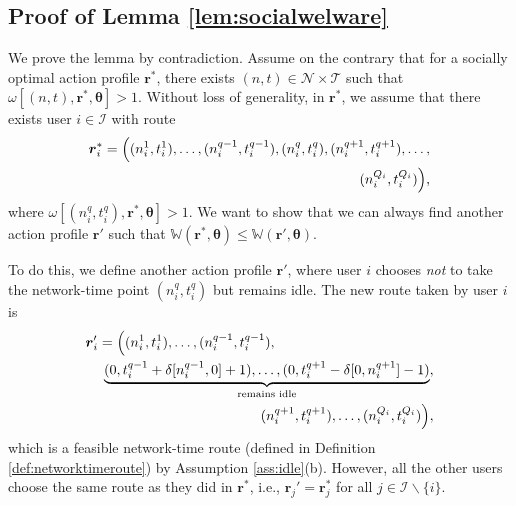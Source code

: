 \documentclass[journal]{IEEEtran}
\newcommand{\mc}[1]{\mathcal{#1}}
\newcommand{\bs}[1]{\boldsymbol{#1}}
\begin{document}
\appendix



\subsection{Proof of Lemma \ref{lem:socialwelware}} \label{app:socialwelware}

  We prove the lemma by contradiction. 
	Assume on the contrary that for a socially optimal action profile $\bs{r}^*$, there exists $(n,t) \in \mc{N} \times \mc{T}$ such that $\omega[(n, t), \boldsymbol{r}^*, \boldsymbol{\theta}] > 1$.
	Without loss of generality, in $\bs{r}^*$, we assume that there exists user $i \in \mc{I}$ with route	
%
\begin{equation}
\begin{split}
	\boldsymbol{r}_i^* = \Bigl((n_i^{1},t_i^{1}),\ldots,(n_i^{q-1},t_i^{q-1}),(n_i^{q},t_i^{q}),(n_i^{q+1},t_i^{q+1}),\ldots,\\(n_i^{Q_i},t_i^{Q_i})\Bigr),
\end{split}
\end{equation}
% 	
where $\omega[(n_i^q, t_i^q), \boldsymbol{r}^*, \boldsymbol{\theta}] > 1$.
  We want to show that we can always find another action profile $\bs{r}'$ such that $\mathbb{W}(\boldsymbol{r}^*, \boldsymbol{\theta}) \leq \mathbb{W}(\boldsymbol{r}', \boldsymbol{\theta})$. %
	
	To do this, we define another action profile $\bs{r}'$, where user $i$ chooses \emph{not} to take the network-time point $(n_i^q, t_i^q)$ but remains idle. The new route taken by user $i$ is 
%
\begin{equation}
\begin{split}
	\boldsymbol{r}_i' = \Bigl((n_i^{1},t_i^{1}),\ldots,(n_i^{q-1},t_i^{q-1}), \hspace{4cm} \\
	\underbrace{(0, t_i^{q-1} + \delta[n_i^{q-1},0] + 1), \ldots,(0,t_i^{q+1} - \delta[0,n_i^{q+1}] - 1)}_{\text{remains idle}}, \\ (n_i^{q+1},t_i^{q+1}), \ldots,(n_i^{Q_i},t_i^{Q_i})\Bigr),
\end{split}
\end{equation}
%	
which is a feasible network-time route (defined in Definition \ref{def:networktimeroute}) by Assumption \ref{ass:idle}(b).
However, all the other users choose the same route as they did in $\bs{r}^*$, i.e., $\bs{r}_j' = \bs{r}_j^*$ for all $j \in \mathcal{I} \backslash \{i\}$.
\end{document}
